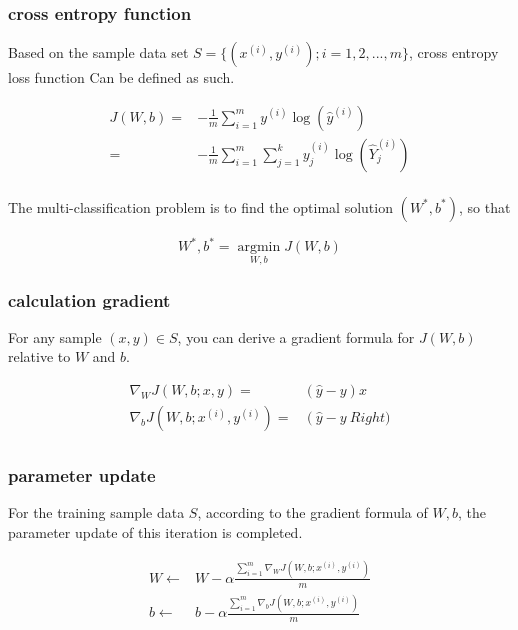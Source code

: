 \begin{content}
\begin{content}
\subsubsection{cross entropy function}

Based on the sample data set $ S = \{ ({x^{(i)}}, {y^{(i)}});i = 1,2,...,m\} $, cross entropy loss function Can be defined as such.

\[\begin{aligned}
  J(W,b) = & - \frac{1}{m}\sum\limits_{i = 1}^m {{y^{(i)}}\log \left( {{{\widehat y} ^{(i)}}} \right)} \\ 
   = & - \frac{1}{m}\sum\limits_{i = 1}^m {\sum\limits_{j = 1}^k {y_j^{(i)}\log \left( {\widehat Y_j^{(i)}} \right)} } \\
\end{aligned} \]

The  multi-classification problem is to find the optimal solution $(W^*,b^*)$, so that

\[W^*,b^* = \mathop {\arg \min }\limits_{W,b} J(W,b)\]

\subsubsection{calculation gradient}

For any sample $(x,y) \in S $, you can derive a gradient formula for $ J(W,b) $ relative to $ W $ and $ b $.

\[\begin{aligned}
  {\nabla _W}J\left( {W,b;x,y} \right) = & \left( {\widehat y - y} \right)x \\ 
  {\nabla _b}J\left( {W,b;{x^{(i)}},{y^{(i)}}} \right) = & \left( {\widehat y - y} \ Right) \\ 
\end{aligned} \]


\subsubsection{parameter update}

For the training sample data $S$, according to the gradient formula of $W, b$, the parameter update of this iteration is completed.

\[\begin{aligned}
  W \leftarrow & W - \alpha \frac{{\sum\limits_{i = 1}^m {{\nabla _W}J\left( {W,b;{x^{(i)}},{y ^{(i)}}} \right)} }}{m} \\ 
  b \leftarrow & b - \alpha \frac{{\sum\limits_{i = 1}^m {{\nabla _b}J\left( {W,b;{x^{(i)}},{y ^{(i)}}} \right)} }}{m} \\ 
\end{aligned} \]


\end{content}
\end{content}
